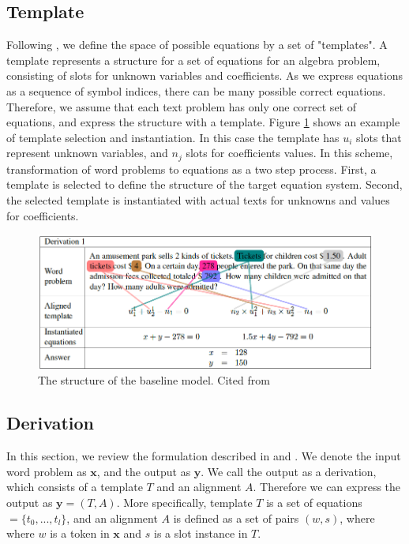 \documentclass[11pt,letterpaper]{article}
\begin{document}
\subsection{Template}
Following \cite{Kushman2014LearningTA}, we define the space of possible equations by a set of "templates". A template represents a structure for a set of equations for an algebra problem, consisting of slots for unknown variables and coefficients. As we express equations as a sequence of symbol indices, there can be many possible correct equations. Therefore, we assume that each text problem has only one correct set of equations, and express the structure with a template. Figure \ref{template} shows an example of template selection and instantiation. In this case the template has $u_i$ slots that represent unknown variables, and $n_j$ slots for coefficients values. In this scheme, transformation of word problems to equations as a two step process. First, a template is selected to define the structure of the target equation system. Second, the selected template is instantiated with actual texts for unknowns and values for coefficients. 
\begin{figure}[ht]
	\centering
	\includegraphics[bb=0 0 877 353, scale=0.5]{template.png}%
    \caption{The structure of the baseline model. Cited from \cite{Kushman2014LearningTA}}
    \label{template}
\end{figure}
\subsection{Derivation}
In this section, we review the formulation described in \cite{Kushman2014LearningTA} and \cite{UpChChYi16}. We denote the input word problem as $\textbf{x}$, and the output as $\textbf{y}$. We call the output as a derivation, which consists of a template $T$ and an alignment $A$. Therefore we can express the output as $\textbf{y} = (T, A)$. More specifically, template $T$ is a set of equations $= \{t_0, ..., t_l\}$, and an alignment $A$ is defined as a set of pairs $(w, s)$, where where $w$ is a token in $\textbf{x}$ and $s$ is a slot instance in $T$.
\end{document}

